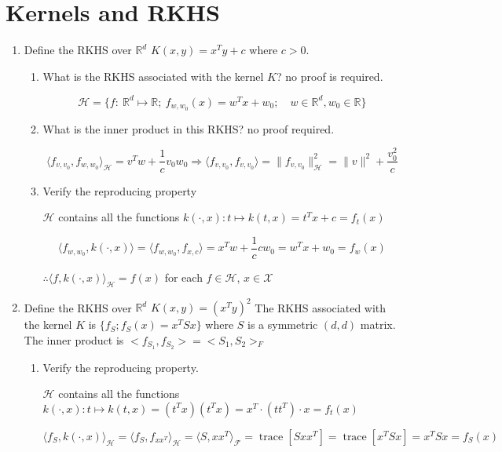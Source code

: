 \documentclass[11pt]{article}
\DeclareMathOperator{\trace}{trace}
\begin{document}
\section{Kernels and RKHS}
\begin{enumerate}
\item Define the RKHS  over $\mathbb{R}^d$ $K(x,y)=x^Ty+c$ where $c>0$. 

\begin{enumerate}
\item What is the RKHS associated with the kernel $K$? no proof is required. 

$$\mathcal{H} = \{f:\ \mathbb{R}^d\mapsto\mathbb{R};\ f_{w,w_0}(x)=w^Tx+w_0;\quad w\in\mathbb{R}^d,w_0\in\mathbb{R}\}$$


\item What is the inner product in this RKHS? no proof required.  

$$\langle f_{v,v_0},f_{w,w_0}\rangle_{\mathcal{H}}=v^Tw+\frac1cv_0w_0\Rightarrow\langle f_{v,v_0},f_{v,v_0}\rangle=\|f_{v,v_0}\|^2_{\mathcal{H}}=\|v\|^2+\frac{v_0^2}c$$


\item Verify the reproducing property

$\mathcal{H}$ contains all the functions $k(\cdot,x): t\mapsto k(t,x)=t^Tx+c=f_t(x)$

$$\langle f_{w,w_0},k(\cdot,x)\rangle=\langle f_{w,w_0},f_{x,c}\rangle=x^Tw+\frac1ccw_0=w^Tx+w_0=f_w(x)$$

$\therefore\langle f,k(\cdot,x)\rangle_{\mathcal{H}}=f(x)$ for each $f\in\mathcal{H}$, $x\in\mathcal{X}$

\end{enumerate}


\item Define the RKHS  over $\mathbb{R}^d$
$K(x,y)=(x^Ty)^2$
The RKHS associated with the kernel $K$ is $\{f_S;f_S(x)=x^T S x\}$ where $S$ is a symmetric $(d,d)$ matrix. The inner product is
$<f_{S_1},f_{S_2}>=<S_1,S_2>_F$

\begin{enumerate}
\item Verify the reproducing property. 

$\mathcal{H}$ contains all the functions 
$k(\cdot,x): t\mapsto k(t,x)=(t^Tx)(t^Tx)=x^T\cdot (tt^T)\cdot x=f_t(x)$

$$ \langle f_{S},k(\cdot,x)\rangle_{\mathcal{H}}=\langle f_{S},f_{xx^T}\rangle_{\mathcal{H}}=\langle S,xx^T\rangle_{\mathcal{F}}=\trace[Sxx^T]=\trace[x^TSx]=x^TS x= f_{S}(x)$$


\end{enumerate}
\end{enumerate}
\end{document}
